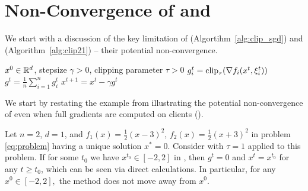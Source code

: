 \documentclass[a4paper,11pt]{article}
\begin{document}
\section{Non-Convergence of  and }

We start with a discussion of the key limitation of  (Algortihm~\ref{alg:clip_sgd}) and  (Algorithm~\ref{alg:clip21}) -- their potential non-convergence.

    \begin{algorithm}[t]
   \caption{ \citep{abadi2016deep}}
   \label{alg:clip_sgd}
   \centering
\begin{algorithmic}[1]
  \Require $x^0 \in \mathbb{R}^d$, stepsize $\gamma > 0$, clipping parameter $\tau > 0$
            \State $g_i^{t} = \operatorname{clip}_{\tau}(\nabla f_i(x^{t},\xi_i^{t}))$ 
        \EndFor
        \State $g^{t} = \frac{1}{n}\sum_{i=1}^n g_i^{t}$
        \State $x^{t+1} = x^t - \gamma g^t$
    \EndFor
\end{algorithmic}
\end{algorithm}


We start by restating the example from \citep{chen2020understanding} illustrating the potential non-convergence of  even when full gradients are computed on clients ().
\begin{example}
    Let $n = 2$, $d = 1$, and $f_1(x) = \frac{1}{2}(x - 3)^2$, $f_2(x) = \frac{1}{2}(x+3)^2$ in problem \eqref{eq:problem} having a unique solution $x^* = 0$. Consider  with $\tau = 1$ applied to this problem. If for some $t_0$ we have $x^{t_0} \in [-2,2]$ in , then $g^t = 0$ and $x^t = x^{t_0}$ for any $t\geq t_0$, which can be seen via direct calculations. In particular, for any $x^0 \in [-2,2],$ the method does not move away from $x^0$.
\end{example}
\end{document}
